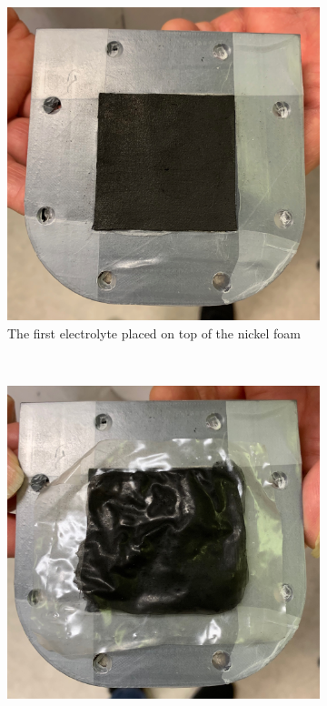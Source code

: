 \begin{figure}[ht]
    \centering
    \begin{subfigure}[b]{0.3\textwidth}
        \includegraphics[width=\textwidth]{DIV./Bilder/Assembly/Ass4.jpg}
        \caption{The first electrolyte placed on top of the nickel foam}
        \label{fig:1Electrode}
    \end{subfigure}
    ~ %
    \begin{subfigure}[b]{0.3\textwidth}
        \includegraphics[width=\textwidth]{DIV./Bilder/Assembly/Ass5.jpg}

\end{subfigure}
\end{figure}
